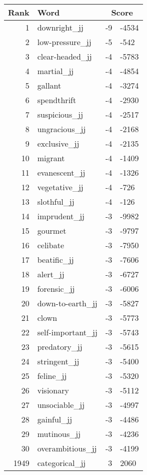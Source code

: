\begin{longtable}[!htbp]{| rlr@{.}l |}
    \hline
    \textbf{Rank} & \textbf{Word} & \multicolumn{2}{c|}{\textbf{Score}} \\
    \hline
    \endhead
    1 & downright\_jj & -9 & -4534 \\
    2 & low-pressure\_jj & -5 & -542 \\
    3 & clear-headed\_jj & -4 & -5783 \\
    4 & martial\_jj & -4 & -4854 \\
    5 & gallant & -4 & -3274 \\
    6 & spendthrift & -4 & -2930 \\
    7 & suspicious\_jj & -4 & -2517 \\
    8 & ungracious\_jj & -4 & -2168 \\
    9 & exclusive\_jj & -4 & -2135 \\
    10 & migrant & -4 & -1409 \\
    11 & evanescent\_jj & -4 & -1326 \\
    12 & vegetative\_jj & -4 & -726 \\
    13 & slothful\_jj & -4 & -126 \\
    14 & imprudent\_jj & -3 & -9982 \\
    15 & gourmet & -3 & -9797 \\
    16 & celibate & -3 & -7950 \\
    17 & beatific\_jj & -3 & -7606 \\
    18 & alert\_jj & -3 & -6727 \\
    19 & forensic\_jj & -3 & -6006 \\
    20 & down-to-earth\_jj & -3 & -5827 \\
    21 & clown & -3 & -5773 \\
    22 & self-important\_jj & -3 & -5743 \\
    23 & predatory\_jj & -3 & -5615 \\
    24 & stringent\_jj & -3 & -5400 \\
    25 & feline\_jj & -3 & -5320 \\
    26 & visionary & -3 & -5112 \\
    27 & unsociable\_jj & -3 & -4997 \\
    28 & gainful\_jj & -3 & -4486 \\
    29 & mutinous\_jj & -3 & -4236 \\
    30 & overambitious\_jj & -3 & -4199 \\
    1949 & categorical\_jj & 3 & 2060 \\

\end{longtable}
